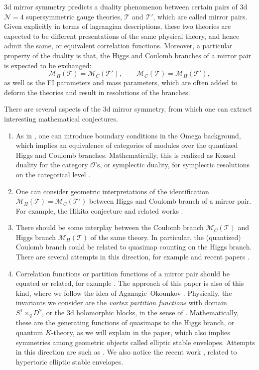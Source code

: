 \documentclass[10pt]{amsart}
\theoremstyle{definition}
\newcommand{\cM}{\mathcal{M}}
\newcommand{\cN}{\mathcal{N}}
\newcommand{\cO}{\mathcal{O}}
\newcommand{\cT}{\mathcal{T}}
\theoremstyle{definition}
\numberwithin{equation}{section}
\theoremstyle{Theorem}
\begin{document}
3d mirror symmetry \cite{PhysMir3, PhysMir2, PhysMir1, Ga-Wit, HW, BDGH} predicts a duality phenomenon between certain pairs of 3d $\cN = 4$ supersymmetric gauge theories, $\cT$ and $\cT'$, which are called mirror pairs. Given explicitly in terms of lagrangian descriptions, these two theories are expected to be different presentations of the same physical theory, and hence admit the same, or equivalent correlation functions. Moreover, a particular property of the duality is that, the Higgs and Coulomb branches of a mirror pair is expected to be exchanged:
$$
\cM_H (\cT) = \cM_C (\cT'), \qquad \cM_C (\cT) = \cM_H (\cT'),
$$
as well as the FI parameters and mass parameters, which are often added to deform the theories and result in resolutions of the branches.

There are several aspects of the 3d mirror symmetry, from which one can extract interesting mathematical conjectures.

\begin{enumerate}[$\bullet$]
	
\setlength{\parskip}{1ex}

\item As in \cite{BDGH}, one can introduce boundary conditions in the Omega background, which implies an equivalence of categories of modules over the quantized Higgs and Coulomb branches. Mathematically, this is realized as Kozsul duality for the category $\cO$'s, or symplectic duality, for symplectic resolutions on the categorical level \cite{BLPW, matdu}.

\item One can consider geometric interpretations of the identification $\cM_H (\cT) = \cM_C (\cT')$ between Higgs and Coulomb branch of a mirror pair. For example, the Hikita conjecture \cite{Hik} and related works \cite{KMP}.

\item There should be some interplay between the Coulomb branch $\cM_C(\cT)$ and Higgs branch $\cM_H (\cT)$ of the same theory. In particular, the (quantized) Coulomb branch could be related to quasimap counting on the Higgs branch. There are several attempts in this direction, for example \cite{BDGHK} and recent papers \cite{MSY, HKW}.

\item Correlation functions or partition functions of a mirror pair should be equated or related, for example \cite{BFK, CDZ}. The approach of this paper is also of this kind, where we follow the idea of Aganagic--Okounkov \cite{Oko, AOelliptic, AOBethe}. Physically, the invariants we consider are the \emph{vortex partition functions} with domain $S^1 \times_q D^2$, or the 3d holomorphic blocks, in the sense of \cite{BDP}. Mathematically, these are the generating functions of quasimaps to the Higgs branch, or quantum $K$-theory, as we will explain in the paper, which also implies symmetries among geometric objects called elliptic stable envelopes. Attempts in this direction are such as \cite{GaKor, Kor, RSVZ, RSVZ2}. We also notice the recent work \cite{Hik}, related to hypertoric elliptic stable envelopes.

\end{enumerate}
\end{document}
